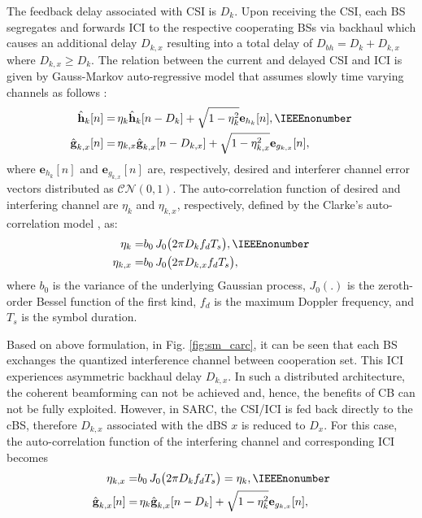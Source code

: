 \documentclass[article,10pt,twocolumn]{IEEEtran}
\begin{document}
The feedback delay associated with CSI is $D_{k}$. Upon receiving the CSI, each BS segregates and forwards ICI to the respective cooperating BSs via backhaul which causes an additional delay $D_{k,x}$ resulting into a total delay of $D_{bh} = D_{k} + D_{k,x}$ where $D_{k,x} \geq D_{k}$. The relation between the current and delayed CSI and ICI is given by Gauss-Markov auto-regressive model \citep{891214} that assumes slowly time varying channels as follows \citep{5755206}:
\begin{align}
\hat{\textbf{h}}_{k}[n] =& \, \eta_{k} \hat{\textbf{h}}_{k} [n-D_{k}]+\sqrt{1-\eta^{2}_{k}}\textbf{e}_{h_{k}}[n],	\IEEEnonumber
\\\hat{\textbf{g}}_{k,x}[n]=& \, \eta_{k,x}\hat{\textbf{g}}_{k,x}[n-D_{k,x}]+\sqrt{1-\eta^{2}_{k,x}}\textbf{e}_{g_{k,x}}[n],
\label{GM_hkgkm_limited}
\end{align}
where $\textbf{e}_{h_{k}}[n]$ and $\textbf{e}_{g_{k,x}}[n]$  are, respectively, desired and interferer channel error vectors distributed as $\mathcal{CN}(0,1)$. The auto-correlation function of desired and interfering channel are $\eta_{k}$ and $\eta_{k,x}$, respectively, defined by the Clarke's auto-correlation model \citep{891214}, \citep{6779222} as:
\begin{align}
\eta_{k} =& b_{0}\, J_{0}\big(2\pi D_{k}f_{d}T_{s}\big),	\IEEEnonumber
\\\eta_{k,x} =& b_{0}\, J_{0}\big(2\pi D_{k,x}f_{d}T_{s}\big),
\label{Correlation}
\end{align}
where $b_{0}$ is the variance of the underlying Gaussian process, $J_{0}(.)$ is the zeroth-order Bessel function of the first kind, $f_{d}$ is the maximum Doppler frequency, and $T_{s}$ is the symbol duration.

Based on above formulation, in Fig. \ref{fig:sm_carc}, it can be seen that each BS exchanges the quantized interference channel between cooperation set. This ICI experiences asymmetric backhaul delay $D_{k,x}$. In such a distributed architecture, the coherent beamforming  can not be achieved and, hence, the benefits of CB can not be fully exploited. However, in SARC, the CSI/ICI is fed back directly to the cBS, therefore $D_{k,x}$ associated with the dBS $x$ is reduced to $D_{x}$. For this case, the auto-correlation function of the interfering channel and corresponding ICI becomes
\begin{align}
\eta_{k,x} =& b_{0}\, J_{0}\big(2\pi D_{k}f_{d}T_{s}\big) = \eta_{k},	\IEEEnonumber
\\\hat{\textbf{g}}_{k,x}[n]=& \, \eta_{k}\hat{\textbf{g}}_{k,x}[n-D_{k}]+\sqrt{1-\eta^{2}_{k}}\textbf{e}_{g_{k,x}}[n],
\label{GM_hkgkm_limited1}
\end{align}
\end{document}

